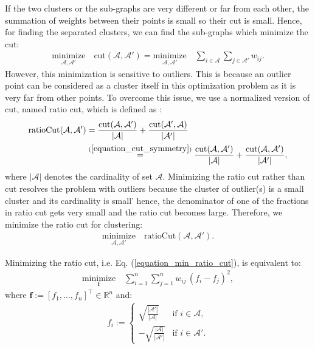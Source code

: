 \documentclass[lang=cn,10pt]{gorgeousnbook}
\numberwithin{equation}{section}%
\numberwithin{figure}{section}%
\begin{document}
If the two clusters or the sub-graphs are very different or far from each other, the summation of weights between their points is small so their cut is small. Hence, for finding the separated clusters, we can find the sub-graphs which minimize the cut:
\begin{align}
\underset{\mathcal{A}, \mathcal{A}'}{\text{minimize}} \quad \text{cut}(\mathcal{A}, \mathcal{A}') = \underset{\mathcal{A}, \mathcal{A}'}{\text{minimize}} \quad \sum_{i \in \mathcal{A}} \sum_{j \in \mathcal{A}'} w_{ij}.
\end{align}
However, this minimization is sensitive to outliers. This is because an outlier point can be considered as a cluster itself in this optimization problem as it is very far from other points. 
To overcome this issue, we use a normalized version of cut, named ratio cut, which is defined as \cite{shi1997normalized,shi2000normalized}:
\begin{align}
\text{ratioCut}(\mathcal{A}, \mathcal{A}') &= \frac{\text{cut}(\mathcal{A}, \mathcal{A}')}{|\mathcal{A}|} + \frac{\text{cut}(\mathcal{A}', \mathcal{A})}{|\mathcal{A}'|} \nonumber \\
&\overset{(\ref{equation_cut_symmetry})}{=} \frac{\text{cut}(\mathcal{A}, \mathcal{A}')}{|\mathcal{A}|} + \frac{\text{cut}(\mathcal{A}, \mathcal{A}')}{|\mathcal{A}'|}, \label{equation_ratio_cut}
\end{align}
where $|\mathcal{A}|$ denotes the cardinality of set $\mathcal{A}$. Minimizing the ratio cut rather than cut resolves the problem with outliers because the cluster of outlier(s) is a small cluster and its cardinality is small' hence, the denominator of one of the fractions in ratio cut gets very small and the ratio cut becomes large. Therefore, we minimize the ratio cut for clustering:
\begin{align}\label{equation_min_ratio_cut}
\underset{\mathcal{A}, \mathcal{A}'}{\text{minimize}} \quad \text{ratioCut}(\mathcal{A}, \mathcal{A}').
\end{align}

\begin{proposition}
Minimizing the ratio cut, i.e. Eq. (\ref{equation_min_ratio_cut}), is equivalent to:
\begin{align}\label{equation_minimization_spectral_clustering_w_f}
\underset{\boldsymbol{f}}{\text{minimize}} \quad \sum_{i=1}^n \sum_{j=1}^n w_{ij}\, (f_i - f_j)^2, 
\end{align}
where $\boldsymbol{f} := [f_1, \dots, f_n]^\top \in \mathbb{R}^n$ and:
\begin{align}\label{equation_f_definition}
f_i := 
\left\{
    \begin{array}{ll}
        \sqrt{\frac{|\mathcal{A}'|}{|\mathcal{A}|}} & \mbox{if } i \in \mathcal{A}, \\
        -\sqrt{\frac{|\mathcal{A}|}{|\mathcal{A}'|}} & \mbox{if } i \in \mathcal{A}'.
    \end{array}
\right.
\end{align}
\end{proposition}
\end{document}
